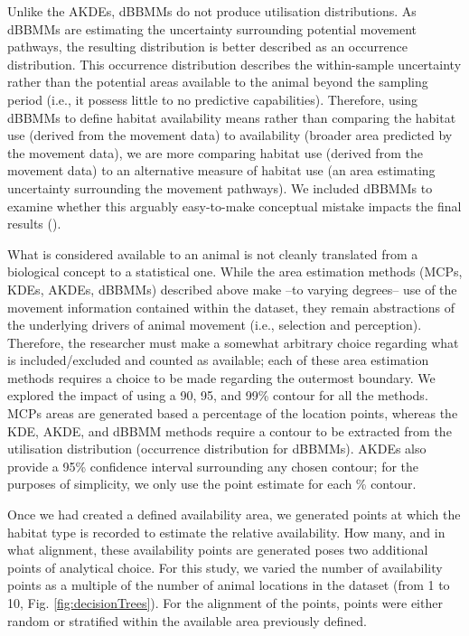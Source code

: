 \documentclass[10pt,a4paper]{article}
\begin{document}
Unlike the AKDEs, dBBMMs do not produce utilisation distributions.
As dBBMMs are estimating the uncertainty surrounding potential movement pathways, the resulting distribution is better described as an occurrence distribution.
This occurrence distribution describes the within-sample uncertainty rather than the potential areas available to the animal beyond the sampling period (i.e., it possess little to no predictive capabilities).
Therefore, using dBBMMs to define habitat availability means rather than comparing the habitat use (derived from the movement data) to availability (broader area predicted by the movement data), we are more comparing habitat use (derived from the movement data) to an alternative measure of habitat use (an area estimating uncertainty surrounding the movement pathways).
We included dBBMMs to examine whether this arguably easy-to-make conceptual mistake impacts the final results ().

What is considered available to an animal is not cleanly translated from a biological concept to a statistical one.
While the area estimation methods (MCPs, KDEs, AKDEs, dBBMMs) described above make --to varying degrees-- use of the movement information contained within the dataset, they remain abstractions of the underlying drivers of animal movement (i.e., selection and perception).
Therefore, the researcher must make a somewhat arbitrary choice regarding what is included/excluded and counted as available; each of these area estimation methods requires a choice to be made regarding the outermost boundary.
We explored the impact of using a 90, 95, and 99\% contour for all the methods.
MCPs areas are generated based a percentage of the location points, whereas the KDE, AKDE, and dBBMM methods require a contour to be extracted from the utilisation distribution (occurrence distribution for dBBMMs).
AKDEs also provide a 95\% confidence interval surrounding any chosen contour; for the purposes of simplicity, we only use the point estimate for each \% contour.

Once we had created a defined availability area, we generated points at which the habitat type is recorded to estimate the relative availability.
How many, and in what alignment, these availability points are generated poses two additional points of analytical choice.
For this study, we varied the number of availability points as a multiple of the number of animal locations in the dataset (from 1 to 10, Fig. \ref{fig:decisionTrees}).
For the alignment of the points, points were either random or stratified within the available area previously defined.
\end{document}
